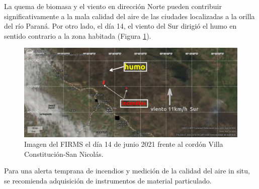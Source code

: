 La quema de biomasa y el viento en dirección Norte pueden contribuir significativamente a la mala calidad del aire de las ciudades localizadas a la orilla del río Paraná. Por otro lado, el día 14, el viento del Sur dirigió el humo en sentido contrario a la zona habitada (Figura \ref{fig:FIRMS}).

\begin{figure}[H]
    \centering
    \includegraphics[width=0.8\paperwidth]{images/image1.jpg}
    \caption{Imagen del FIRMS el día 14 de junio 2021 frente al cordón Villa Constitución-San Nicolás.}
    \label{fig:FIRMS}
\end{figure}

Para una alerta temprana de incendios y medición de la calidad del aire in situ, se recomienda adquisición de instrumentos de material particulado.